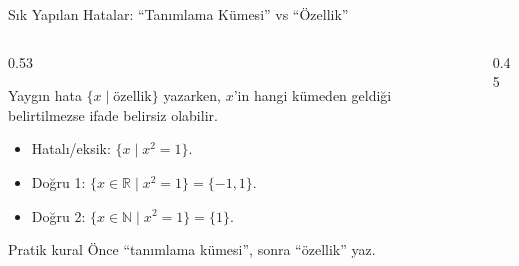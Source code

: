 \documentclass[light]{lutbeamer}
\begin{document}
\begin{frame}{Sık Yapılan Hatalar: ``Tanımlama Kümesi'' vs ``Özellik''}
    \begin{columns}[T]
        \begin{column}{0.53\textwidth}
            \begin{block}{Yaygın hata}
                $\{x \mid \text{özellik}\}$ yazarken, $x$'in hangi kümeden geldiği
                belirtilmezse ifade belirsiz olabilir.
            \end{block}

            \begin{itemize}
                \item Hatalı/eksik: $\{x \mid x^2=1\}$.
                \item Doğru 1: $\{x\in\mathbb{R}\mid x^2=1\}=\{-1,1\}$.
                \item Doğru 2: $\{x\in\mathbb{N}\mid x^2=1\}=\{1\}$.
            \end{itemize}

            \begin{alertblock}{Pratik kural}
                Önce ``tanımlama kümesi'', sonra ``özellik'' yaz.
            \end{alertblock}
        \end{column}
        \begin{column}{0.45\textwidth}
            \centering
        \end{column}
    \end{columns}
\end{frame}
\end{document}
